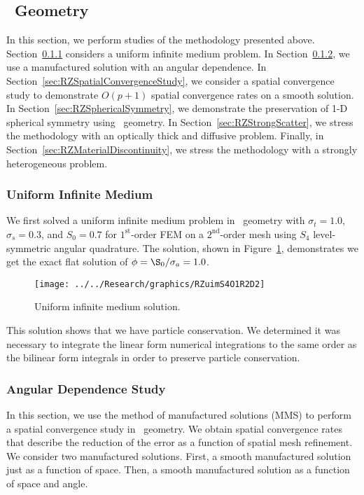\documentclass[12pt,letterpaper]{article}
\begin{document}
\FloatBarrier

\subsection{\RZ\ Geometry}
\label{sec:ResultsRZ}
In this section, we perform studies of the methodology presented above. Section~\ref{sec:RZUniformInfiniteMedium} considers a uniform infinite medium problem. In Section~\ref{sec:RZAngularDependenceStudy}, we use a manufactured solution with an angular dependence. In Section~\ref{sec:RZSpatialConvergenceStudy}, we consider a spatial convergence study to demonstrate $O(p+1)$ spatial convergence rates on a smooth solution. In Section~\ref{sec:RZSphericalSymmetry}, we demonstrate the preservation of 1-D spherical symmetry using \RZ\ geometry. In Section~\ref{sec:RZStrongScatter}, we stress the methodology with an optically thick and diffusive problem. Finally, in Section~\ref{sec:RZMaterialDiscontinuity}, we stress the methodology with a strongly heterogeneous problem.

\subsubsection{Uniform Infinite Medium}
\label{sec:RZUniformInfiniteMedium}
We first solved a uniform infinite medium problem in \RZ\ geometry with $\sigma_t=1.0$, $\sigma_s=0.3$, and $S_0=0.7$ for $1^\text{st}$-order FEM on a $2^\text{nd}$-order mesh using $S_4$ level-symmetric angular quadrature. The solution, shown in Figure~\ref{fig:RZuimS401R2D2}, demonstrates we get the exact flat solution of $\phi=\S_0 / \sigma_a = 1.0$.
%
\begin{figure}[!htb]
\centering
\texttt{[image: ../../Research/graphics/RZuimS4O1R2D2]}
\caption{Uniform infinite medium solution.}
\label{fig:RZuimS401R2D2}
\end{figure}
%
This solution shows that we have particle conservation. We determined it was necessary to integrate the linear form  numerical integrations to the same order as the bilinear form integrals in order to preserve particle conservation.

\subsubsection{Angular Dependence Study}
\label{sec:RZAngularDependenceStudy}
In this section, we use the method of manufactured solutions (MMS) to perform a spatial convergence study in \RZ\ geometry. We obtain spatial convergence rates that describe the reduction of the error as a function of spatial mesh refinement. We consider two manufactured solutions. First, a smooth manufactured solution just as a function of space. Then, a smooth manufactured solution as a function of space and angle.
\end{document}
